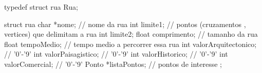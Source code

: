 typedef struct rua Rua;

struct rua {
	char *nome; // nome da rua
	int limite1; // pontos (cruzamentos , vertices) que delimitam a rua
	int limite2;
	float comprimento; // tamanho da rua
	float tempoMedio; // tempo medio a percorrer essa rua
	int valorArquitectonico; // '0'-'9'
	int valorPaisagistico; // '0'-'9'
	int valorHistorico; // '0'-'9'
	int valorComercial; // '0'-'9'
	Ponto *listaPontos; // pontos de interesse
};
